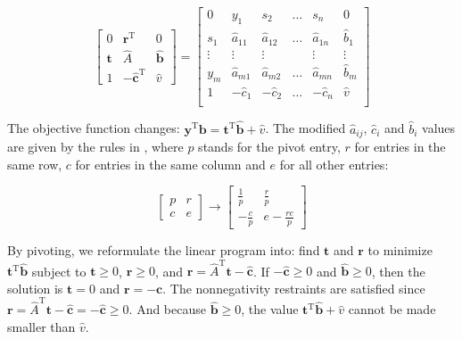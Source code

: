 \documentclass[12pt]{article}
\begin{document}
\begin{equation} \label{eq:tableau2}
\begin{bmatrix} 
0 & \mathbf{r}^\text{T} & 0 \\
\mathbf{t} & \hat{A} & \mathbf{\hat{b}} \\
1 & -\hat{\mathbf{c}}^\text{T} & \hat{v}
\end{bmatrix}
=
\begin{bmatrix} 
0 		& y_1 		& s_2		& \dots	& s_n & 0 \\
s_1		& \hat{a}_{11}	& \hat{a}_{12}	& \dots	& \hat{a}_{1n} & \hat{b}_1 \\
\vdots	&\vdots		&\vdots		&		& \vdots & \vdots \\
y_m		& \hat{a}_{m1}	& \hat{a}_{m2}	& \dots	& \hat{a}_{mn} & \hat{b}_m \\
1		& -\hat{c}_1		& -\hat{c}_2		& \dots	& -\hat{c}_n	 & \hat{v} \\
\end{bmatrix}
\end{equation}

The objective function changes: $\mathbf{y}^\text{T}\mathbf{b} = \mathbf{t}^\text{T}\mathbf{\hat{b}} + \hat{v}$. The modified $\hat{a}_{ij}$, $\hat{c}_i$ and $\hat{b}_i$ values are given by the rules in \cite{ferguson}, where $p$ stands for the pivot entry, $r$ for entries in the same row, $c$ for entries in the same column and $e$ for all other entries: 

\begin{equation} \label{pivotrules}
\begin{bmatrix} 
p & r \\
c & e 
\end{bmatrix}
\rightarrow
\begin{bmatrix} 
\frac{1}{p} & \frac{r}{p} \\
-\frac{c}{p} & e-\frac{rc}{p} 
\end{bmatrix}
\end{equation}

By pivoting, we reformulate the linear program into: find $\mathbf{t}$ and $\mathbf{r}$ to minimize $\mathbf{t}^\text{T}\mathbf{\hat{b}}$ subject to $\mathbf{t}\geq0$, $\mathbf{r}\geq0$, and $\mathbf{r} = \hat{A}^\text{T}\mathbf{t} -\mathbf{\hat{c}}$.
If $-\mathbf{\hat{c}}\geq0$ and $\mathbf{\hat{b}}\geq0$, then the solution is $\mathbf{t}=0$ and $\mathbf{r}=-\mathbf{c}$. The nonnegativity restraints are satisfied since $\mathbf{r}=\hat{A}^\text{T}\mathbf{t} - \mathbf{\hat{c}} = -\mathbf{\hat{c}} \geq 0$. And because $\mathbf{\hat{b}} \geq 0$, the value $\mathbf{t}^\text{T}\mathbf{\hat{b}} + \hat{v}$ cannot be made smaller than $\hat{v}$.
\end{document}
